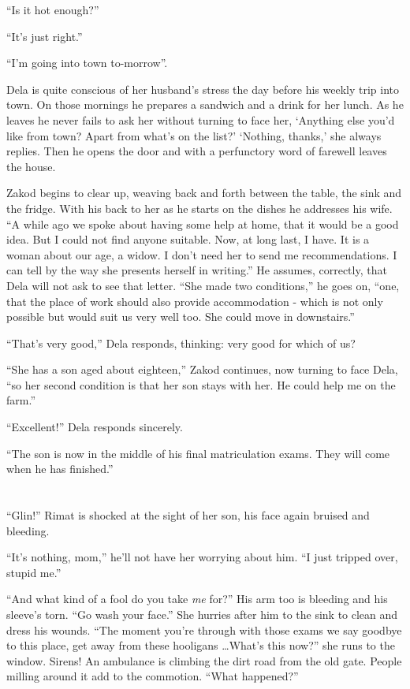 \documentclass[twoside,11pt]{book}
\begin{document}
``Is it hot enough?''

``It's just right.''

``I'm going into town to-morrow''.

Dela is quite conscious of her husband's stress the day before his weekly trip into town. On those mornings he prepares
a sandwich and a drink for her lunch. As he leaves he never fails to ask her without turning to face her, `Anything
else you'd like from town? Apart from what's on the list?' `Nothing, thanks,' she always replies. Then he opens the
door and with a perfunctory word of farewell leaves the house.

Zakod begins to clear up, weaving back and forth between the table, the sink and the fridge. With his back to her as he
starts on the dishes he addresses his wife. ``A while ago we spoke about having some help at home, that it
would be a good idea. But I could not find anyone suitable. Now, at long last, I have. It is a woman about our age, a
widow.  I don't need her to send me recommendations. I can tell by the way she presents herself in
writing.'' He assumes, correctly, that Dela will not ask to see that letter. ``She made
two conditions,'' he goes on, ``one, that the place of work should also provide accommodation - which is
not only possible but would suit us very well too.  She could move in downstairs.''

``That's very good,'' Dela responds, thinking: very good for which of us?

``She has a son aged about eighteen,'' Zakod continues, now turning to face Dela,
``so her second condition is that her son stays with her. He could help me on the farm.''

``Excellent!'' Dela responds sincerely.

``The son is now in the middle of his final matriculation exams. They will come when he has finished.''


\bigskip

\chapter{}

``Glin!'' Rimat is shocked at the sight of her son, his face again bruised and bleeding.

``It's nothing, mom,'' he'll not have her worrying about him. ``I just tripped over, stupid
me.''

``And what kind of a fool do you take \textit{me} for?'' His arm too is bleeding and his
sleeve's torn. ``Go wash your face.'' She hurries after him to the sink to clean and dress
his wounds. ``The moment you're through with those exams we say goodbye to this place, get away from these
hooligans {\dots}What's this now?'' she runs to the window. Sirens! An ambulance is climbing the dirt road
from the old gate. People milling around it add to the commotion. ``What happened?''
\end{document}
